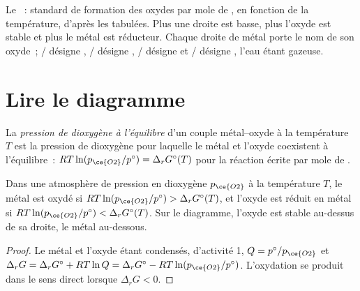 \begin{omfigure}
{\small Le ~:  standard de formation des oxydes
par mole de , en fonction de la température, d'après les  tabulées. Plus
une droite est basse, plus l'oxyde est stable et plus le métal est réducteur.
Chaque droite de métal porte le nom de son oxyde~; / désigne ,
/ désigne , / désigne 
et / désigne , l'eau étant gazeuse.}
\end{omfigure}

\section{Lire le diagramme}

\begin{definition}\label{def:b2:ellingham:oxygen-pressure}
La \emph{pression de dioxygène à l'équilibre} d'un
couple métal–oxyde à la température $T$ est la pression de dioxygène pour laquelle le métal
et l'oxyde coexistent à l'équilibre~: $RT\ln(p_{\ce{O2}}/p^\circ) = \Delta_r
G^\circ(T)$ pour la réaction écrite par mole de .
\end{definition}

\begin{theorem}\label{thm:b2:ellingham:domains}
Dans une atmosphère de pression en dioxygène $p_{\ce{O2}}$ à la température $T$, le
métal est oxydé si $RT\ln(p_{\ce{O2}}/p^\circ) > \Delta_r G^\circ(T)$, et
l'oxyde est réduit en métal si $RT\ln(p_{\ce{O2}}/p^\circ) < \Delta_r
G^\circ(T)$. Sur le diagramme, l'oxyde est stable au-dessus de sa droite, le métal
au-dessous.
\end{theorem}

\begin{proof}
Le métal et l'oxyde étant condensés, d'activité 1, $Q = p^\circ/p_{\ce{O2}}$ et
$\Delta_r G = \Delta_r G^\circ + RT\ln Q = \Delta_r G^\circ - RT\ln(p_{\ce{O2}}/
p^\circ)$. L'oxydation se produit dans le sens direct lorsque $\Delta_r G < 0$.
\end{proof}

